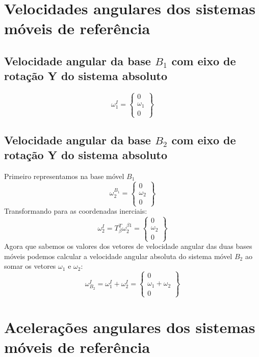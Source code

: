 \documentclass[a4paper, 12pt]{article}
\begin{document}
\section{Velocidades angulares dos sistemas móveis de referência}
	\subsection{Velocidade angular da base $B_1$ com eixo de rotação Y do sistema absoluto}
	\begin{equation}
		\omega^I_1 = 
		\begin{Bmatrix}
			0\\ \omega_1\\0\
		\end{Bmatrix}
	\end{equation}
	
	\subsection{Velocidade angular da base $B_2$ com eixo de rotação Y do sistema absoluto}
	Primeiro representamos na base móvel $B_1$
	\begin{equation}
		\omega^{B_1}_2 = 
		\begin{Bmatrix}
			0\\ \omega_2 \\0
		\end{Bmatrix}
	\end{equation}
	Transformando para as coordenadas inerciais:
	\begin{equation}
		\omega^I_2 = T^T_\beta \omega^{\beta 1}_2 = \begin{Bmatrix}
			0\\
			\omega_2\\
			0
		\end{Bmatrix}
	\end{equation}
	Agora que sabemos os valores dos vetores de velocidade angular das duas bases móveis podemos calcular a velocidade angular absoluta do sistema móvel $B_2$ ao somar os vetores $\omega_1$ e $\omega_2$:
		\begin{equation}
			\omega^I_{B_2} = \omega_1^I + \omega_2^I = \begin{Bmatrix}
			0\\
			\omega_1 + \omega_2\\
			0
		\end{Bmatrix}
		\end{equation}
		
		
\section{Acelerações angulares dos sistemas móveis de referência}
\end{document}
